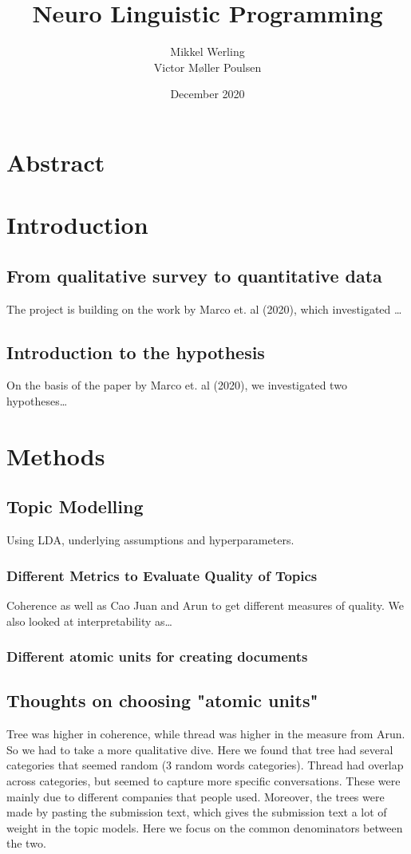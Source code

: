 \documentclass{article}
\title{Neuro Linguistic Programming}
\author{Mikkel Werling \\ Victor Møller Poulsen}
\date{December 2020}
\begin{document}
    \maketitle
    \section{Abstract}
    \section{Introduction}
    \subsection{From qualitative survey to quantitative data}
    The project is building on the work by Marco et. al (2020), which investigated \dots
    \subsection{Introduction to the hypothesis}
    On the basis of the paper by Marco et. al (2020), we investigated two hypotheses\dots

    \section{Methods}
    \subsection{Topic Modelling}
    Using LDA, underlying assumptions and hyperparameters. 
    \subsubsection{Different Metrics to Evaluate Quality of Topics}
    Coherence as well as Cao Juan and Arun to get different measures of quality. We also looked at interpretability as\dots
    \subsubsection{Different atomic units for creating documents}
    \subsection{Thoughts on choosing "atomic units"}
    Tree was higher in coherence, while thread was higher in the measure from Arun. So we had to take a more qualitative dive. Here we found that tree had several categories that seemed random (3 random words categories). Thread had overlap across categories, but seemed to capture more specific conversations. These were mainly due to different companies that people used. Moreover, the trees were made by pasting the submission text, which gives the submission text a lot of weight in the topic models. Here we focus on the common denominators between the two. 
\end{document}
